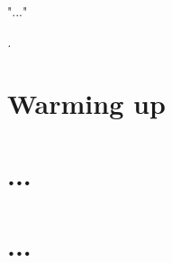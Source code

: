 \epigraph{"..."}
{\textit{.}}

\section{Warming up}
\begin{multicols}{2}


\end{multicols}

\section{...} %
\begin{multicols}{2}



\end{multicols}

\section{...} %
\begin{multicols}{2}




\end{multicols}


